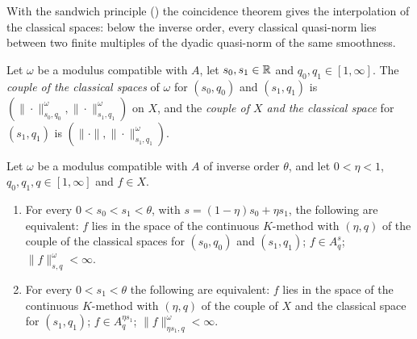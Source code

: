 With the sandwich principle () the coincidence theorem
gives the interpolation of the classical spaces: below the inverse order, every classical
quasi-norm lies between two finite multiples of the dyadic quasi-norm of the same smoothness.

\begin{definition}
\label{def:modulus-couples}
\leanok
{}
Let $\omega$ be a modulus compatible with $A$, let $s_0, s_1 \in \mathbb{R}$ and
$q_0, q_1 \in [1, \infty]$. The \emph{couple of the classical spaces} of $\omega$ for
$(s_0, q_0)$ and $(s_1, q_1)$ is
$(\|\cdot\|^{\omega}_{s_0, q_0}, \|\cdot\|^{\omega}_{s_1, q_1})$ on $X$, and the \emph{couple of
$X$ and the classical space} for $(s_1, q_1)$ is $(\|\cdot\|, \|\cdot\|^{\omega}_{s_1, q_1})$.
\end{definition}

\begin{corollary}
\label{cor:modulus-spaces-interpolate}
\leanok
{}
Let $\omega$ be a modulus compatible with $A$ of inverse order $\theta$, and let
$0 < \eta < 1$, $q_0, q_1, q \in [1, \infty]$ and $f \in X$.
\begin{enumerate}
  \item For every $0 < s_0 < s_1 < \theta$, with $s = (1 - \eta) s_0 + \eta s_1$, the following
    are equivalent: $f$ lies in the space of the continuous $K$-method with $(\eta, q)$ of the
    couple of the classical spaces for $(s_0, q_0)$ and $(s_1, q_1)$; $f \in A^s_q$;
    $\|f\|^{\omega}_{s, q} < \infty$.
  \item For every $0 < s_1 < \theta$ the following are equivalent: $f$ lies in the space of the
    continuous $K$-method with $(\eta, q)$ of the couple of $X$ and the classical space for
    $(s_1, q_1)$; $f \in A^{\eta s_1}_q$; $\|f\|^{\omega}_{\eta s_1, q} < \infty$.
\end{enumerate}
\end{corollary}

